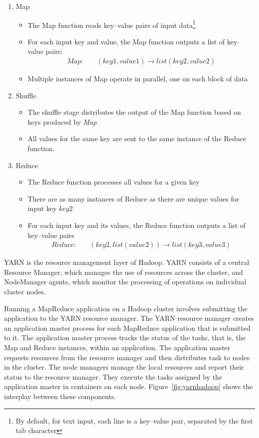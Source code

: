 \begin{enumerate}
\item Map
\begin{itemize}
   \item The Map function reads key--value pairs of input data\footnote{By default, for text input, each line is a key--value pair, separated by the first tab character}
   \item For each input key and value, the Map function outputs a list of key--value pairs:
\begin{align*}
Map: &\quad(key1, value1) \rightarrow list(key2, value2)
\end{align*}
   \item Multiple instances of Map operate in parallel, one on each block of data
\end{itemize}
\item Shuffle
\begin{itemize}
   \item The shuffle stage distributes the output of the Map function based on keys produced by \emph{Map}
   \item All values for the same key are sent to the same instance of the Reduce function. 
\end{itemize}
\item Reduce
\begin{itemize}
   \item The Reduce function processes all values for a given key
   \item There are as many instances of Reduce as there are unique values for input key $key2$
   \item For each input key and its values, the Reduce function outputs a list of key--value pairs
\begin{align*}
Reduce: &\quad(key2, list(value2)) \rightarrow list(key3, value3)
\end{align*}
\end{itemize}
\end{enumerate}

YARN is the resource management layer of Hadoop. YARN consists of a central Resource Manager, which manages the use of resources across the cluster, and NodeManager agents, which monitor the processing of operations on individual cluster nodes. 

Running a MapReduce application on a Hadoop cluster involves submitting the application to the YARN resource manager. The YARN resource manager creates an application master process for each MapReduce application that is submitted to it. The application master process tracks the status of the tasks, that is, the Map and Reduce instances, within an application. The application master requests resources from the resource manager and then distributes task to nodes in the cluster. The node managers manage the local resources and report their status to the resource manager. They execute the tasks assigned by the application master in containers on each node. Figure~\ref{fig:yarnhadoop} shows the interplay between these components.

